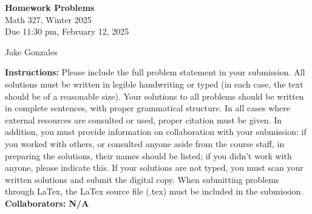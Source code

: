 \documentclass [10pt]{article}
\newcommand{\jg}[1]{{\color{blue} #1}}
\begin{document}
\begin{center}
{\bf Homework Problems}\\
Math 327, Winter 2025\\
Due 11:30 pm, February 12, 2025
\end{center}

\begin{center}
\jg{
    Jake Gonzales}
\end{center}

{\bf Instructions:} Please include the full problem statement in your submission.
All solutions must be written in legible handwriting
or typed (in each case, the text should be of a reasonable size). Your solutions to all problems should be written in complete sentences, with proper grammatical structure. In all cases where external resources are consulted or used, proper citation must be given. In addition, you must provide information on collaboration with your submission: if you worked with others, or consulted anyone aside from the course staff, in preparing the solutions, their names should be listed; if you didn't work with anyone, please indicate this. 
If your solutions are not typed, you must scan your written solutions and submit
the digital copy. When submitting problems through LaTex, the LaTex source file
(.tex) must be included in the submission. \\

\jg{
\textbf{Collaborators: N/A }
}
\end{document}
